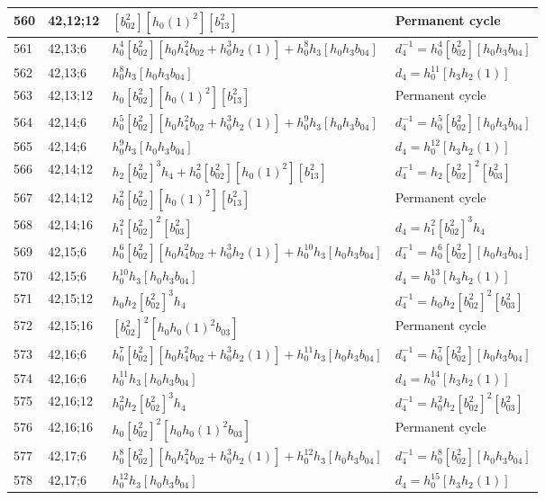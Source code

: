 \documentclass{article}
\begin{document}
\begin{longtable}{|l|l|>{\raggedright\arraybackslash}p{6cm}|>{\raggedright\arraybackslash}p{6cm}|}
\hline
560 & 42,12;12 & $[b_{02}^2][h_0(1)^2][b_{13}^2]$ & Permanent cycle\\
\hline
561 & 42,13;6 & $h_0^4[b_{02}^2][h_0h_4^2b_{02} + h_0^3h_2(1)] + h_0^8h_3[h_0h_3b_{04}]$ & $d_{4}^{-1}=h_0^4[b_{02}^2][h_0h_3b_{04}]$\\
562 & 42,13;6 & $h_0^8h_3[h_0h_3b_{04}]$ &$d_{4}=h_0^{11}[h_3h_2(1)]$\\
\hline
563 & 42,13;12 & $h_0[b_{02}^2][h_0(1)^2][b_{13}^2]$ & Permanent cycle\\
\hline
564 & 42,14;6 & $h_0^5[b_{02}^2][h_0h_4^2b_{02} + h_0^3h_2(1)] + h_0^9h_3[h_0h_3b_{04}]$ & $d_{4}^{-1}=h_0^5[b_{02}^2][h_0h_3b_{04}]$\\
565 & 42,14;6 & $h_0^9h_3[h_0h_3b_{04}]$ &$d_{4}=h_0^{12}[h_3h_2(1)]$\\
\hline
566 & 42,14;12 & $h_2[b_{02}^2]^3h_4 + h_0^2[b_{02}^2][h_0(1)^2][b_{13}^2]$ & $d_{4}^{-1}=h_2[b_{02}^2]^2[b_{03}^2]$\\
567 & 42,14;12 & $h_0^2[b_{02}^2][h_0(1)^2][b_{13}^2]$ & Permanent cycle\\
\hline
568 & 42,14;16 & $h_1^2[b_{02}^2]^2[b_{03}^2]$ &$d_{4}=h_1^2[b_{02}^2]^3h_4$\\
\hline
569 & 42,15;6 & $h_0^6[b_{02}^2][h_0h_4^2b_{02} + h_0^3h_2(1)] + h_0^{10}h_3[h_0h_3b_{04}]$ & $d_{4}^{-1}=h_0^6[b_{02}^2][h_0h_3b_{04}]$\\
570 & 42,15;6 & $h_0^{10}h_3[h_0h_3b_{04}]$ &$d_{4}=h_0^{13}[h_3h_2(1)]$\\
\hline
571 & 42,15;12 & $h_0h_2[b_{02}^2]^3h_4$ & $d_{4}^{-1}=h_0h_2[b_{02}^2]^2[b_{03}^2]$\\
\hline
572 & 42,15;16 & $[b_{02}^2]^2[h_0h_0(1)^2b_{03}]$ & Permanent cycle\\
\hline
573 & 42,16;6 & $h_0^7[b_{02}^2][h_0h_4^2b_{02} + h_0^3h_2(1)] + h_0^{11}h_3[h_0h_3b_{04}]$ & $d_{4}^{-1}=h_0^7[b_{02}^2][h_0h_3b_{04}]$\\
574 & 42,16;6 & $h_0^{11}h_3[h_0h_3b_{04}]$ &$d_{4}=h_0^{14}[h_3h_2(1)]$\\
\hline
575 & 42,16;12 & $h_0^2h_2[b_{02}^2]^3h_4$ & $d_{4}^{-1}=h_0^2h_2[b_{02}^2]^2[b_{03}^2]$\\
\hline
576 & 42,16;16 & $h_0[b_{02}^2]^2[h_0h_0(1)^2b_{03}]$ & Permanent cycle\\
\hline
577 & 42,17;6 & $h_0^8[b_{02}^2][h_0h_4^2b_{02} + h_0^3h_2(1)] + h_0^{12}h_3[h_0h_3b_{04}]$ & $d_{4}^{-1}=h_0^8[b_{02}^2][h_0h_3b_{04}]$\\
578 & 42,17;6 & $h_0^{12}h_3[h_0h_3b_{04}]$ &$d_{4}=h_0^{15}[h_3h_2(1)]$\\

\end{longtable}
\end{document}
